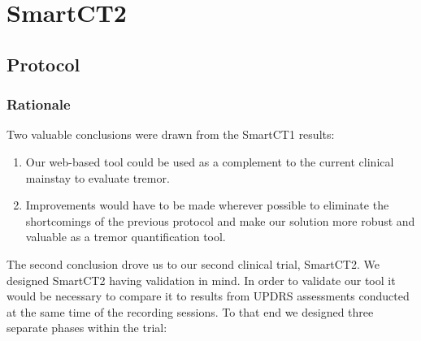 
\section{SmartCT2}
\label{sec:SmartCT2}

\subsection{Protocol}
\label{subsec:SmartCT2Protocol}

\subsubsection{Rationale}
\label{subsubsec:smartCT2Rationale}
Two valuable conclusions were drawn from the \gls{SmartCT1} results:

\begin{enumerate}
\item Our web-based tool could be used as a complement to the current clinical mainstay to evaluate tremor.
\item Improvements would have to be made wherever possible to eliminate the shortcomings of the previous protocol and make our solution more robust and valuable as a tremor quantification tool. 
\end{enumerate}

The second conclusion drove us to our second clinical trial, \gls{SmartCT2}. We designed \gls{SmartCT2} having validation in mind. In order to validate our tool it would be necessary to compare it to results from \gls{UPDRS} assessments conducted at the same time of the recording sessions. To that end we designed three separate phases within the trial:

